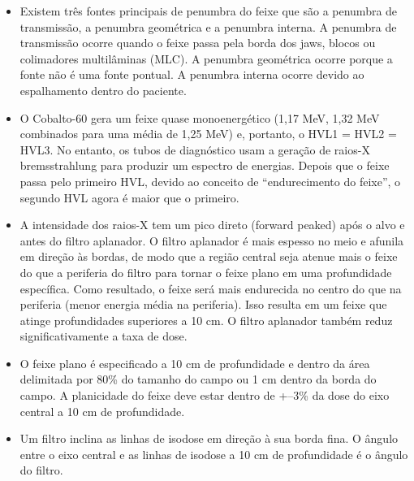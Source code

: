\documentclass[11pt,a4paper]{article}
\newcounter{exemplo}
\begin{document}
\begin{exemplo}
\begin{itemize}
        \item Existem três fontes principais de penumbra do feixe que são a penumbra de transmissão, a penumbra geométrica e a penumbra interna. A penumbra de transmissão ocorre quando o feixe passa pela borda dos jaws, blocos ou colimadores multilâminas (MLC). A penumbra geométrica ocorre porque a fonte não é uma fonte pontual. A penumbra interna ocorre devido ao espalhamento dentro do paciente.
        
        \item O Cobalto-60 gera um feixe quase monoenergético (1,17 MeV, 1,32 MeV combinados para uma média de 1,25 MeV) e, portanto, o HVL1 = HVL2 = HVL3. No entanto, os tubos de diagnóstico usam a geração de raios-X bremsstrahlung para produzir um espectro de energias. Depois que o feixe passa pelo primeiro HVL, devido ao conceito de “endurecimento do feixe”, o segundo HVL agora é maior que o primeiro.
        
        \item A intensidade dos raios-X tem um pico direto (forward peaked) após o alvo e antes do filtro aplanador. O filtro aplanador é mais espesso no meio e afunila em direção às bordas, de modo que a região central seja atenue mais o feixe do que a periferia do filtro para tornar o feixe plano em uma profundidade específica. Como resultado, o feixe será mais endurecida no centro do que na periferia (menor energia média na periferia). Isso resulta em um feixe que atinge profundidades superiores a 10 cm. O filtro aplanador também reduz significativamente a taxa de dose.
        
        \item O feixe plano é especificado a 10 cm de profundidade e dentro da área delimitada por 80\% do tamanho do campo ou 1 cm dentro da borda do campo. A planicidade do feixe deve estar dentro de +–3\% da dose do eixo central a 10 cm de profundidade.
        
        \item Um filtro inclina as linhas de isodose em direção à sua borda fina. O ângulo entre o eixo central e as linhas de isodose a 10 cm de profundidade é o ângulo do filtro.
        

\end{itemize}
\end{exemplo}
\end{document}
